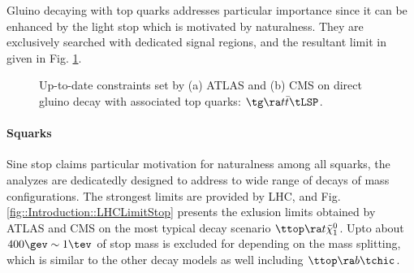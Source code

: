 Gluino decaying with top quarks addresses particular importance since it can be enhanced by the light stop which is motivated by naturalness. They are exclusively searched with dedicated signal regions, and the resultant limit in given in Fig. \ref{fig::Introduction::LHCLimitGtt}.

\begin{figure}[h]
  \centering
    \caption{Up-to-date constraints set by (a) ATLAS and (b) CMS on direct gluino decay with associated top quarks: $\tg \ra t\bar{t} \tLSP$.}
    \label{fig::Introduction::LHCLimitGtt}
\end{figure}


\paragraph{Squarks}
Sine stop claims particular motivation for naturalness among all squarks, 
the analyzes are dedicatedly designed to address to wide range of decays of mass configurations.
The strongest limits are provided by LHC, and Fig. \ref{fig::Introduction::LHCLimitStop} presents the exlusion limits obtained by ATLAS and CMS on the most typical decay scenario $\ttop \ra t \tilde{\chi}_1^0$.
Upto about $400\gev \sim 1\tev$ of stop mass is excluded for depending on the mass splitting, which is similar to the other decay models as well including $\ttop \ra b \tchic$.

